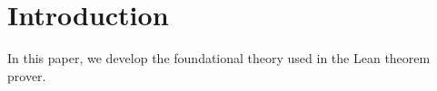 \section{Introduction}
In this paper, we develop the foundational theory used in the Lean theorem prover.
